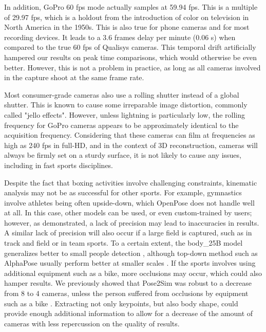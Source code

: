 In addition, GoPro 60 fps mode actually samples at 59.94 fps. This is a multiple of 29.97 fps, which is a holdout from the introduction of color on television in North America in the 1950s. This is also true for phone cameras and for most recording devices. It leads to a 3.6 frames delay per minute (0.06 s) when compared to the true 60 fps of Qualisys cameras. This temporal drift artificially hampered our results on peak time comparisons, which would otherwise be even better. However, this is not a problem in practice, as long as all cameras involved in the capture shoot at the same frame rate.

Most consumer-grade cameras also use a rolling shutter instead of a global shutter. This is known to cause some irreparable image distortion, commonly called "jello effects". However, unless lightning is particularly low, the rolling frequency for GoPro cameras appears to be approximately identical to the acquisition frequency. Considering that these cameras can film at frequencies as high as 240 fps in full-HD, and in the context of 3D reconstruction, cameras will always be firmly set on a sturdy surface, it is not likely to cause any issues, including in fast sports disciplines.

Despite the fact that boxing activities involve challenging constraints, kinematic analysis may not be as successful for other sports. For example, gymnastics involve athletes being often upside-down, which OpenPose does not handle well at all. In this case, other models can be used, or even custom-trained by users; however, as demonstrated, a lack of precision may lead to inaccuracies in results. A similar lack of precision will also occur if a large field is captured, such as in track and field or in team sports. To a certain extent, the body\_25B model generalizes better to small people detection \cite{Hidalgo2019}, although top-down method such as AlphaPose \cite{Fang2017} usually perform better at smaller scales \cite{Cao2019}. If the sports involves using additional equipment such as a bike, more occlusions may occur, which could also hamper results. We previously showed that Pose2Sim was robust to a decrease from 8 to 4 cameras, unless the person suffered from occlusions by equipment such as a bike \cite{Pagnon2021}. Extracting not only keypoints, but also body shape, could provide enough additional information to allow for a decrease of the amount of cameras with less repercussion on the quality of results. 

